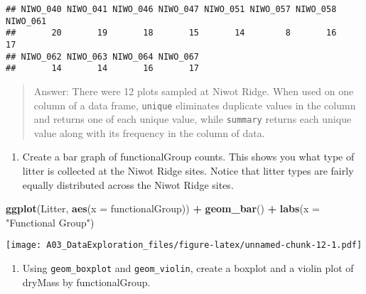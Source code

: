 \documentclass[]{article}
\newenvironment{Shaded}{\begin{snugshade}}{\end{snugshade}}
\newcommand{\DataTypeTok}[1]{\textcolor[rgb]{0.13,0.29,0.53}{#1}}
\newcommand{\KeywordTok}[1]{\textcolor[rgb]{0.13,0.29,0.53}{\textbf{#1}}}
\newcommand{\NormalTok}[1]{#1}
\newcommand{\OperatorTok}[1]{\textcolor[rgb]{0.81,0.36,0.00}{\textbf{#1}}}
\newcommand{\StringTok}[1]{\textcolor[rgb]{0.31,0.60,0.02}{#1}}
\providecommand{\tightlist}{%
  \setlength{\itemsep}{0pt}\setlength{\parskip}{0pt}}
\begin{document}
\begin{Shaded}
\end{Shaded}

\begin{verbatim}
## NIWO_040 NIWO_041 NIWO_046 NIWO_047 NIWO_051 NIWO_057 NIWO_058 NIWO_061 
##       20       19       18       15       14        8       16       17 
## NIWO_062 NIWO_063 NIWO_064 NIWO_067 
##       14       14       16       17
\end{verbatim}

\begin{quote}
Answer: There were 12 plots sampled at Niwot Ridge. When used on one
column of a data frame, \texttt{unique} eliminates duplicate values in
the column and returns one of each unique value, while \texttt{summary}
returns each unique value along with its frequency in the column of
data.
\end{quote}

\begin{enumerate}
\def\labelenumi{\arabic{enumi}.}
\setcounter{enumi}{13}
\tightlist
\item
  Create a bar graph of functionalGroup counts. This shows you what type
  of litter is collected at the Niwot Ridge sites. Notice that litter
  types are fairly equally distributed across the Niwot Ridge sites.
\end{enumerate}

\begin{Shaded}
\begin{Highlighting}[]
\KeywordTok{ggplot}\NormalTok{(Litter, }\KeywordTok{aes}\NormalTok{(}\DataTypeTok{x =}\NormalTok{ functionalGroup)) }\OperatorTok{+}\StringTok{ }\KeywordTok{geom_bar}\NormalTok{() }\OperatorTok{+}\StringTok{ }\KeywordTok{labs}\NormalTok{(}\DataTypeTok{x =} \StringTok{"Functional Group"}\NormalTok{)}
\end{Highlighting}
\end{Shaded}

\texttt{[image: A03\_DataExploration\_files/figure-latex/unnamed-chunk-12-1.pdf]}

\begin{enumerate}
\def\labelenumi{\arabic{enumi}.}
\setcounter{enumi}{14}
\tightlist
\item
  Using \texttt{geom\_boxplot} and \texttt{geom\_violin}, create a
  boxplot and a violin plot of dryMass by functionalGroup.
\end{enumerate}
\end{document}
